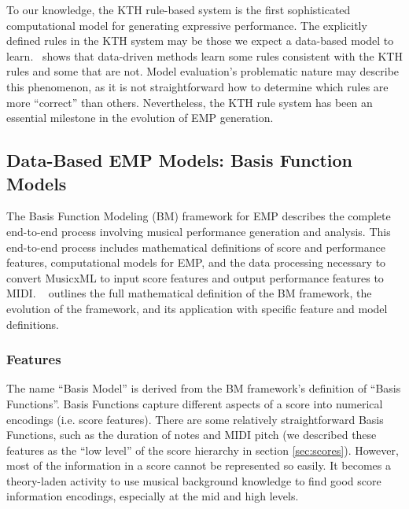 To our knowledge, the KTH rule-based system is the first sophisticated computational model for generating expressive performance. The explicitly defined rules in the KTH system may be those we expect a data-based model to learn.~\citet{widmer2002machine} shows that data-driven methods learn some rules consistent with the KTH rules and some that are not. Model evaluation's problematic nature may describe this phenomenon, as it is not straightforward how to determine which rules are more ``correct'' than others. Nevertheless, the KTH rule system has been an essential milestone in the evolution of EMP generation. 

\subsection{Data-Based EMP Models: Basis Function Models}\label{sec:data-based}
The Basis Function Modeling (BM) framework for EMP describes the complete end-to-end process involving musical performance generation and analysis. This end-to-end process includes mathematical definitions of score and performance features, computational models for EMP, and the data processing necessary to convert MusicxML to input score features and output performance features to MIDI.%
~\citet{eduardo2018computational} outlines the full mathematical definition of the BM framework, the evolution of the framework, and its application with specific feature and model definitions.

\subsubsection{Features}
The name ``Basis Model'' is derived from the BM framework's definition of ``Basis Functions''. Basis Functions capture different aspects of a score into numerical encodings (i.e. score features). There are some relatively straightforward Basis Functions, such as the duration of notes and MIDI pitch (we described these features as the ``low level'' of the score hierarchy in section \ref{sec:scores}). However, most of the information in a score cannot be represented so easily. It becomes a theory-laden activity to use musical background knowledge to find good score information encodings, especially at the mid and high levels.

\newcommand{\mperf}{\beta_{\Omega}}

